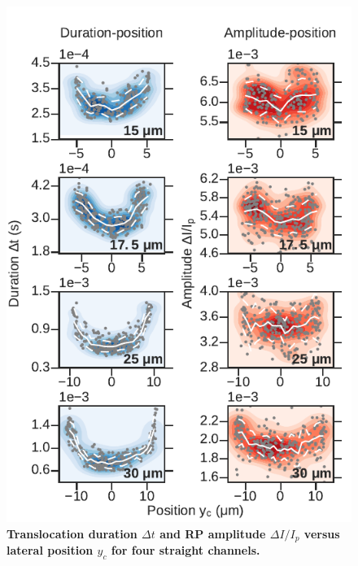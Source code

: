 				\begin{figure}
					\includegraphics[width=.75\textwidth]{dtdIystraight.pdf}
					\caption{\textbf{Translocation duration $\Delta t$ and RP amplitude $\Delta I/I_{p}$ versus lateral position $y_{c}$ for four straight channels.}}
					\label{fig:dtdIy}
				\end{figure}
				

